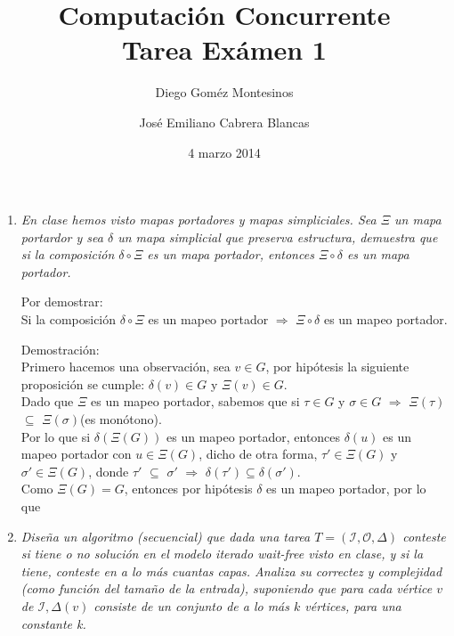 \documentclass{article}
\title{Computación Concurrente \\ \Large{Tarea Exámen 1}}
\author{
  Diego Goméz Montesinos
  \and
  José Emiliano Cabrera Blancas
  }
\date{4 marzo 2014}
\begin{document}
\maketitle
\begin{enumerate}
  
\item{
    \textsl{
      En clase hemos visto mapas portadores y mapas simpliciales. Sea $\Xi$ un
      mapa portardor y sea $\delta$ un mapa simplicial que preserva estructura,
      demuestra que si la composición $\delta \circ \Xi$ es un mapa portador, 
      entonces $\Xi \circ \delta$ es un mapa portador.\\
    }
    
    Por demostrar:\\
    Si la composición $\delta \circ \Xi$ es un mapeo portador $\Rightarrow$ 
    $\Xi \circ \delta$ es un mapeo portador.
    
    Demostración:\\
    Primero hacemos una observación, sea $v \in G$, por hipótesis la siguiente 
    proposición se cumple: $\delta(v) \in G$ y $\Xi(v) \in G$.\\
    Dado que $\Xi$ es un mapeo portador, sabemos que si $\tau \in G$ y 
    $\sigma \in G$ $\Rightarrow$ $\Xi(\tau)$ $\subseteq$ $\Xi(\sigma)$(es monótono).\\
    Por lo que si $\delta(\Xi(G))$ es un mapeo portador, entonces $\delta(u)$ es un
    mapeo portador con $u \in \Xi(G)$, dicho de otra forma, $\tau' \in \Xi(G)$ y 
    $\sigma' \in \Xi(G)$, donde $\tau'$ $\subseteq$ $\sigma'$ $\Rightarrow$ $\delta(\tau') 
    \subseteq \delta(\sigma')$.\\
    Como $\Xi(G) = G$, entonces por hipótesis $\delta$ es un mapeo portador, por lo que 
    
  }
  
\item{
    \textsl{ 
      Diseña un algoritmo (secuencial) que dada una tarea $T = (\mathcal{I},\mathcal{O},\Delta)$
      conteste si tiene o no solución en el modelo iterado wait-free visto en clase, y si la tiene,
      conteste en a lo más cuantas capas. Analiza su correctez y complejidad (como función del tamaño
      de la entrada), suponiendo que para cada vértice $v$ de $\mathcal{I},\Delta(v)$ consiste de 
      un conjunto de a lo más $k$ vértices, para una constante k.
    }

}
\end{enumerate}
\end{document}
